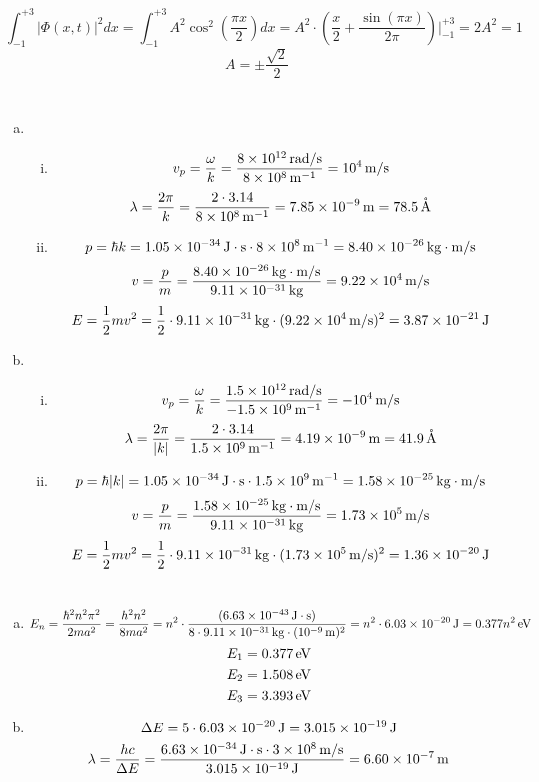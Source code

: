 \documentclass{article}
\newcommand{\unit}[1]{{\rm\,#1}}
\begin{document}
\section{}
$$\int_{-1}^{+3}|\Phi(x,t)|^2dx=\int_{-1}^{+3}A^2\cos^2\left(\frac{\pi x}{2}\right)dx=A^2\cdot\left(\frac{x}{2}+\frac{\sin(\pi x)}{2\pi}\right)\bigg|_{-1}^{+3}=2A^2=1$$
$$A=\pm\frac{\sqrt{2}}{2}$$

\section{}
\begin{enumerate}[(a)]
\item
\begin{enumerate}[(i)]
\item
$$v_p=\frac{\omega}{k}=\frac{8\times10^{12}\unit{rad/s}}{8\times10^8\unit{m^{-1}}}=10^4\unit{m/s}$$
$$\lambda=\frac{2\pi}{k}=\frac{2\cdot3.14}{8\times10^8\unit{m^{-1}}}=7.85\times10^{-9}\unit{m}=78.5\unit{\mathring{A}}$$
\item
$$p=\hbar k=1.05\times10^{-34}\unit{J\cdot s}\cdot8\times10^8\unit{m^{-1}}=8.40\times10^{-26}\unit{kg\cdot m/s}$$
$$v=\frac{p}{m}=\frac{8.40\times10^{-26}\unit{kg\cdot m/s}}{9.11\times10^{-31}\unit{kg}}=9.22\times10^4\unit{m/s}$$
$$E=\frac{1}{2}mv^2=\frac{1}{2}\cdot9.11\times10^{-31}\unit{kg}\cdot(9.22\times10^4\unit{m/s})^2=3.87\times10^{-21}\unit{J}$$
\end{enumerate}
\item
\begin{enumerate}[(i)]
\item
$$v_p=\frac{\omega}{k}=\frac{1.5\times10^{12}\unit{rad/s}}{-1.5\times10^9\unit{m^{-1}}}=-10^4\unit{m/s}$$
$$\lambda=\frac{2\pi}{|k|}=\frac{2\cdot3.14}{1.5\times10^9\unit{m^{-1}}}=4.19\times10^{-9}\unit{m}=41.9\unit{\mathring{A}}$$
\item
$$p=\hbar |k|=1.05\times10^{-34}\unit{J\cdot s}\cdot1.5\times10^9\unit{m^{-1}}=1.58\times10^{-25}\unit{kg\cdot m/s}$$
$$v=\frac{p}{m}=\frac{1.58\times10^{-25}\unit{kg\cdot m/s}}{9.11\times10^{-31}\unit{kg}}=1.73\times10^5\unit{m/s}$$
$$E=\frac{1}{2}mv^2=\frac{1}{2}\cdot9.11\times10^{-31}\unit{kg}\cdot(1.73\times10^5\unit{m/s})^2=1.36\times10^{-20}\unit{J}$$
\end{enumerate}
\end{enumerate}

\section{}
\begin{enumerate}[(a)]
\item
$$E_n=\frac{\hbar^2n^2\pi^2}{2ma^2}=\frac{h^2n^2}{8ma^2}=n^2\cdot\frac{(6.63\times10^{-43}\unit{J\cdot s})}{8\cdot9.11\times10^{-31}\unit{kg}\cdot(10^{-9}\unit{m})^2}=n^2\cdot6.03\times10^{-20}\unit{J}=0.377n^2\unit{eV}$$
$$E_1=0.377\unit{eV}$$
$$E_2=1.508\unit{eV}$$
$$E_3=3.393\unit{eV}$$
\item
$$\Delta E=5\cdot6.03\times10^{-20}\unit{J}=3.015\times10^{-19}\unit{J}$$
$$\lambda=\frac{hc}{\Delta E}=\frac{6.63\times10^{-34}\unit{J\cdot s}\cdot3\times10^8\unit{m/s}}{3.015\times10^{-19}\unit{J}}=6.60\times10^{-7}\unit{m}$$
\end{enumerate}
\end{document}
